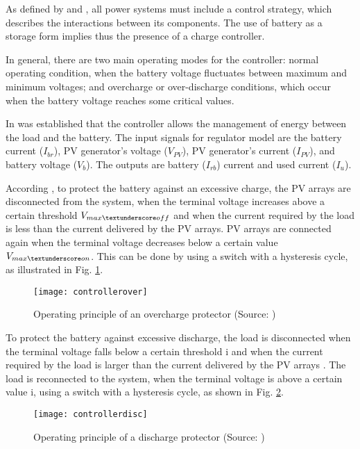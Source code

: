 As defined by \cite{Hansen} and \cite{Mellit}, all power systems must include a control strategy, which describes the interactions between its components. The use of battery as a storage form implies thus the presence of a charge controller. 

In general, there are two main operating modes for the controller: normal operating condition, when the battery voltage fluctuates between maximum and minimum voltages; and overcharge or over-discharge conditions, which occur when the battery voltage reaches some critical values. 

In \cite{Mellit} was established that the controller allows the management of energy between the load and the battery. The input signals for regulator model are the battery current ($ I_{br} $), PV generator's voltage ($ V_{PV} $), PV generator's current ($ I_{PV} $), and battery voltage ($ V_{b} $). The outputs are battery ($ I_{rb} $) current and used current ($ I_{u} $). 

According \cite{Hansen}, to protect the battery against an excessive charge, the PV arrays are disconnected from the system, when the terminal voltage increases above a certain threshold $ V_{max \textunderscore off} $ and when the current required by the load is less than the current delivered by the PV arrays. PV arrays are connected again when the terminal voltage decreases below a certain value $ V_{max \textunderscore on} $. This can be done by using a switch with a hysteresis cycle, as illustrated in Fig. \ref{fig:controllerover}. 

\begin{figure}[h]
\texttt{[image: controllerover]}
\centering
\caption{Operating principle of an overcharge protector (Source: \cite{Hansen})}
\label{fig:controllerover}
\end{figure}

To protect the battery against excessive discharge, the load is disconnected when the terminal voltage falls below a certain threshold i and when the current required by the load is larger than the current delivered by the PV arrays \cite{Hansen}. The load is reconnected to the system, when the terminal voltage is above a certain value i, using a switch with a hysteresis cycle, as shown in Fig. \ref{fig:controllerdisc}. 

\begin{figure}[h]
\texttt{[image: controllerdisc]}
\centering
\caption{Operating principle of a discharge protector (Source: \cite{Hansen})}
\label{fig:controllerdisc}
\end{figure}

